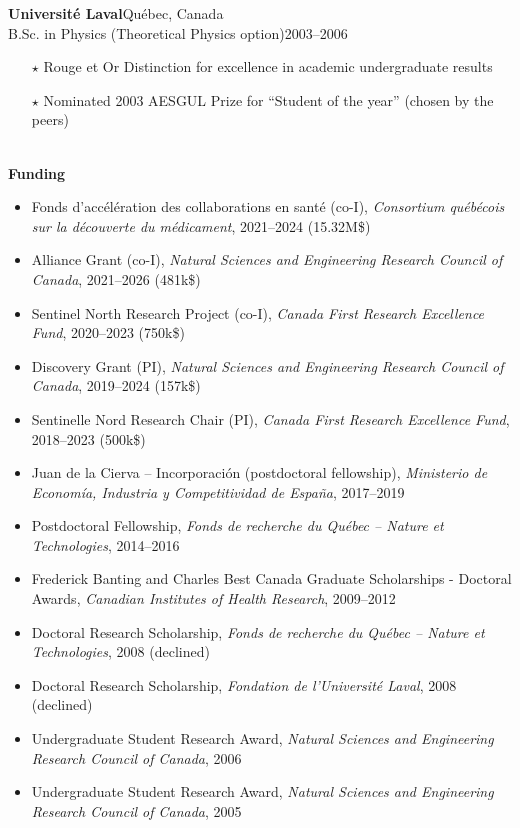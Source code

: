 \documentclass[11pt]{article}
\newcommand{\TitreSection}[1]{\colorbox{background}{\makebox[\textwidth-0.5em][c]{\Large\textrm{\textsc{#1}}}}\vspace{0.75\baselineskip}\\}
\begin{document}
%
\pagebreak%
\textbf{Universit\'e Laval}\hfill Qu\'ebec, Canada\\
B.Sc. in Physics (Theoretical Physics option)\hfill 2003--2006
\begin{itemize}[leftmargin=1.5em]\small
  \item[$\star$] Rouge et Or Distinction for excellence in academic undergraduate results
  \item[$\star$] Nominated 2003 AESGUL Prize for ``Student of the year'' (chosen by the peers)
\end{itemize}
%
%
%
%
%
\TitreSection{Funding and Awards}
%
\textbf{Funding}
%
\begin{itemize}
  \item Fonds d'accélération des collaborations en santé (co-I), \textit{Consortium québécois sur la découverte du médicament}, 2021--2024 (15.32M\$)
  \item Alliance Grant (co-I), \textit{Natural Sciences and Engineering Research Council of Canada}, 2021--2026 (481k\$)
  \item Sentinel North Research Project (co-I), \textit{Canada First Research Excellence Fund}, 2020--2023 (750k\$)
  \item Discovery Grant (PI), \textit{Natural Sciences and Engineering Research Council of Canada}, 2019--2024 (157k\$)
  \item Sentinelle Nord Research Chair (PI), \textit{Canada First Research Excellence Fund}, 2018--2023 (500k\$)
  \item Juan de la Cierva -- Incorporaci\'on (postdoctoral fellowship), \textit{Ministerio de Econom\'ia, Industria y Competitividad de Espa\~{n}a}, 2017--2019
  \item Postdoctoral Fellowship, \textit{Fonds de recherche du Qu\'ebec -- Nature et Technologies}, 2014--2016
  \item Frederick Banting and Charles Best Canada Graduate Scholarships - Doctoral Awards, \textit{Canadian Institutes of Health Research}, 2009--2012
  \item Doctoral Research Scholarship, \textit{Fonds de recherche du Qu\'ebec -- Nature et Technologies}, 2008 (declined)
  \item Doctoral Research Scholarship, \textit{Fondation de l'Universit\'e Laval}, 2008 (declined)
  \item Undergraduate Student Research Award, \textit{Natural Sciences and Engineering Research Council of Canada}, 2006
  \item Undergraduate Student Research Award, \textit{Natural Sciences and Engineering Research Council of Canada}, 2005
\end{itemize}
\end{document}
